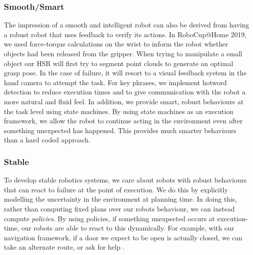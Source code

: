 \documentclass[runningheads,a4paper]{llncs}
\begin{document}
\subsubsection{Smooth/Smart}
The impression of a smooth and intelligent robot can also be derived from having a robust robot that uses feedback to verify its actions. In RoboCup@Home 2019, we used force-torque calculations on the wrist to inform the robot whether objects had been released from the gripper. When trying to manipulate a small object our HSR will first try to segment point clouds to generate an optimal grasp pose. In the case of failure, it will resort to a visual feedback system in the hand camera to attempt the task. For key phrases, we implement hotword detection to reduce execution times and to give communication with the robot a more natural and fluid feel. 
In addition, we provide smart, robust behaviours at the task level using state machines. 
By using state machines as an execution framework, we allow the robot to continue acting in the environment even after something unexpected has happened.
This provides much smarter behaviours than a hard coded approach.

\subsubsection{Stable}
To develop stable robotics systems, we care about robots with robust behaviours that can react to failure at the point of execution. 
We do this by explicitly modelling the uncertainty in the environment at planning time.
In doing this, rather than computing fixed plans over our robots behaviour, we can instead compute \emph{policies}.
By using policies, if something unexpected occurs at execution-time, our robots are able to react to this dynamically.
For example, with our navigation framework, if a door we expect to be open is actually closed, we can take an alternate route, or ask for help \cite{lacerda2019probabilistic}.
\end{document}
